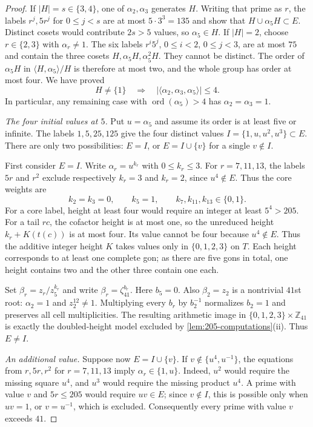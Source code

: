 \documentclass[10pt,a4paper]{amsart}
\newcommand{\Z}{\mathbb Z}
\begin{document}
\begin{proof}
If $|H|=s\in\{3,4\}$, one of $\alpha_2,\alpha_3$ generates $H$.
Writing that prime as $r$, the labels $r^j,5r^j$ for $0\le j<s$
are at most $5\cdot3^3=135$ and show that
$H\cup\alpha_5H\subset E$. Distinct cosets would contribute
$2s>5$ values, so $\alpha_5\in H$.
If $|H|=2$, choose $r\in\{2,3\}$ with $\alpha_r\ne1$.
The six labels $r^i5^j$, $0\le i<2$, $0\le j<3$, are at most
$75$ and contain the three cosets $H,\alpha_5H,\alpha_5^2H$.
They cannot be distinct. The order of $\alpha_5H$ in
$\langle H,\alpha_5\rangle/H$ is therefore at most two, and the
whole group has order at most four. We have proved
\begin{equation}\label{eq:205-small-phase-subgroup}
 H\ne\{1\}\quad\Longrightarrow\quad
 |\langle\alpha_2,\alpha_3,\alpha_5\rangle|\le4.
\end{equation}
In particular, any remaining case with
$\operatorname{ord}(\alpha_5)>4$ has $\alpha_2=\alpha_3=1$.

\smallskip\noindent
\emph{The four initial values at $5$.}
Put $u=\alpha_5$ and assume its order is at least five or infinite.
The labels $1,5,25,125$ give the four distinct values
$I=\{1,u,u^2,u^3\}\subset E$. There are only two possibilities:
$E=I$, or $E=I\cup\{v\}$ for a single $v\notin I$.

First consider $E=I$. Write $\alpha_r=u^{k_r}$ with
$0\le k_r\le3$. For $r=7,11,13$, the labels $5r$ and $r^2$
exclude respectively $k_r=3$ and $k_r=2$, since $u^4\notin E$.
Thus the core weights are
\[
 k_2=k_3=0,\qquad k_5=1,\qquad
 k_7,k_{11},k_{13}\in\{0,1\}.
\]
For a core label, height at least four would require an integer at
least $5^4>205$. For a tail $rc$, the cofactor height is at most one,
so the unreduced height $k_r+K(t(c))$ is at most four. Its value
cannot be four because $u^4\notin E$. Thus the additive integer height
$K$ takes values only in $\{0,1,2,3\}$ on $T$. Each height corresponds
to at least one complete gon; as there are five gons in total, one height contains two
and the other three contain one each.

Set $\beta_r=z_r/z_5^{k_r}$ and write
$\beta_r=\zeta_{41}^{b_r}$. Here $b_5=0$. Also $\beta_2=z_2$ is a
nontrivial $41$st root: $\alpha_2=1$ and $z_2^{12}\ne1$.
Multiplying every $b_r$ by $b_2^{-1}$ normalizes $b_2=1$ and preserves
all cell multiplicities. The resulting arithmetic image in
$\{0,1,2,3\}\times\Z_{41}$ is exactly the doubled-height model
excluded by \cref{lem:205-computations}(ii). Thus $E\ne I$.

\smallskip\noindent
\emph{An additional value.}
Suppose now $E=I\cup\{v\}$. If
$v\notin\{u^4,u^{-1}\}$, the equations from $r,5r,r^2$ for
$r=7,11,13$ imply $\alpha_r\in\{1,u\}$.
Indeed, $u^2$ would require the missing square $u^4$, and $u^3$
would require the missing product $u^4$. A prime with value $v$ and
$5r\le205$ would require $uv\in E$; since $v\notin I$, this is
possible only when $uv=1$, or $v=u^{-1}$, which is excluded.
Consequently every prime with value $v$ exceeds $41$.


\end{proof}
\end{document}
